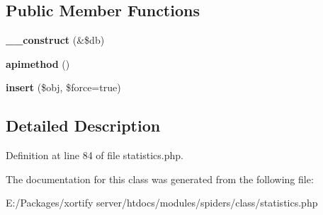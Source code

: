 \subsection*{Public Member Functions}
\begin{DoxyCompactItemize}
\item 
\hypertarget{class_spiders_statistics_handler_aaf2ef772755ec6f361d44e16cc9ffd69}{{\bfseries \-\_\-\-\_\-construct} (\&\$db)}\label{class_spiders_statistics_handler_aaf2ef772755ec6f361d44e16cc9ffd69}

\item 
\hypertarget{class_spiders_statistics_handler_a0e4d9fe24385734582ac6c5b582bf361}{{\bfseries apimethod} ()}\label{class_spiders_statistics_handler_a0e4d9fe24385734582ac6c5b582bf361}

\item 
\hypertarget{class_spiders_statistics_handler_acb0b5c3bb58794228e1fd2b4f888323f}{{\bfseries insert} (\$obj, \$force=true)}\label{class_spiders_statistics_handler_acb0b5c3bb58794228e1fd2b4f888323f}

\end{DoxyCompactItemize}


\subsection{Detailed Description}


Definition at line 84 of file statistics.\-php.



The documentation for this class was generated from the following file\-:\begin{DoxyCompactItemize}
\item 
E\-:/\-Packages/xortify server/htdocs/modules/spiders/class/statistics.\-php\end{DoxyCompactItemize}

